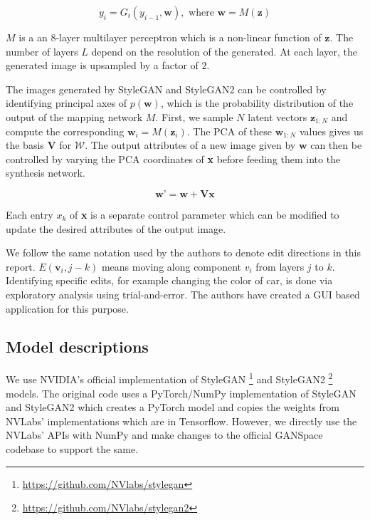 \begin{equation}
  y_i = G_i(y_{i-1}, \mathbf{w}),\text{ where }\mathbf{w} = M(\mathbf{z})
\end{equation}

$M$ is a an $8$-layer multilayer perceptron which is a non-linear function of $\mathbf{z}$. The number of layers $L$ depend on the resolution of the generated. At each layer, the generated image is upsampled by a factor of $2$.

The images generated by StyleGAN and StyleGAN2 can be controlled by identifying principal axes of $p(\textbf{w})$, which is the probability distribution of the output of the mapping network $M$. First, we sample $N$ latent vectors $\textbf{z}_{1:N}$ and compute the corresponding $\textbf{w}_{i} = M(\textbf{z}_{i})$. The PCA of these $\textbf{w}_{1:N}$ values gives us the basis $\textbf{V}$ for $\mathcal{W}$. The output attributes of a new image given by $\textbf{w}$ can then be controlled by varying the PCA coordinates of \textbf{x} before feeding them into the synthesis network. 

\begin{equation}
    \textbf{w'} = \textbf{w} + \textbf{Vx}
\end{equation}

Each entry $x_{k}$ of \textbf{x} is a separate control parameter which can be modified to update the desired attributes of the output image.

We follow the same notation used by the authors to denote edit directions in this report. $E(\textbf{v}_{i}, j-k)$ means moving along component $v_{i}$ from layers $j$ to $k$. Identifying specific edits, for example changing the color of car, is done via exploratory analysis using trial-and-error. The authors have created a GUI based application for this purpose.

\subsection{Model descriptions}

We use NVIDIA's official implementation of StyleGAN \footnote{\url{https://github.com/NVlabs/stylegan}} and StyleGAN2 \footnote{\url{https://github.com/NVlabs/stylegan2}} models.
The original code uses a PyTorch/NumPy implementation of StyleGAN and StyleGAN2 which creates a PyTorch model and copies the weights from NVLabs' implementations which are in Tensorflow. However, we directly use the NVLabs' APIs with NumPy and make changes to the official GANSpace codebase to support the same.

